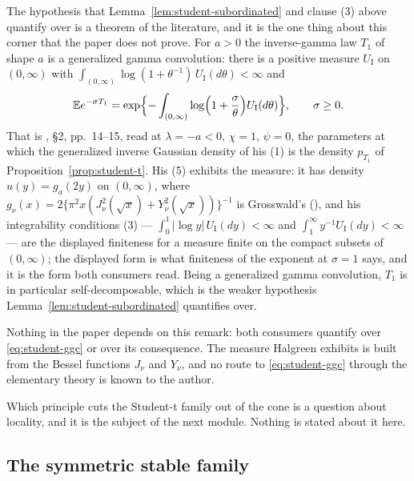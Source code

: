 \begin{remark}
\label{rem:student-ggc}
The hypothesis that Lemma~\ref{lem:student-subordinated} and clause (3) above quantify over is
a theorem of the literature, and it is the one thing about this corner that the paper does not
prove. For $a > 0$ the inverse-gamma law $T_1$ of shape $a$ is a generalized gamma convolution:
there is a positive measure $U_{\mathrm I}$ on $(0,\infty)$ with
$\int_{(0,\infty)}\log(1 + \theta^{-1})\,U_{\mathrm I}(d\theta) < \infty$ and
\begin{equation}\label{eq:student-ggc}
  \mathbb{E}e^{-\sigma T_1}
   = \exp\Bigl\{-\int_{(0,\infty)}\log\Bigl(1 + \frac{\sigma}{\theta}\Bigr)
       U_{\mathrm I}(d\theta)\Bigr\}, \qquad \sigma \ge 0 .
\end{equation}
That is , \S2, pp.~14--15, read at $\lambda = -a < 0$, $\chi = 1$,
$\psi = 0$, the parameters at which the generalized inverse Gaussian density of his (1) is the
density $p_{T_1}$ of Proposition~\ref{prop:student-t}. His (5) exhibits the measure: it has
density $u(y) = g_a(2y)$ on $(0,\infty)$, where
$g_\nu(x) = 2\{\pi^2x(J_\nu^2(\sqrt x) + Y_\nu^2(\sqrt x))\}^{-1}$ is Grosswald's
(), and his integrability conditions (3) ---
$\int_0^1|\log y|\,U_{\mathrm I}(dy) < \infty$ and $\int_1^\infty y^{-1}U_{\mathrm I}(dy) <
\infty$ --- are the displayed finiteness for a measure finite on the compact subsets of
$(0,\infty)$; the displayed form is what finiteness of the exponent at $\sigma = 1$ says, and it
is the form both consumers read. Being a generalized gamma convolution, $T_1$ is in particular
self-decomposable, which is the weaker hypothesis Lemma~\ref{lem:student-subordinated}
quantifies over.

Nothing in the paper depends on this remark: both consumers quantify over
\ref{eq:student-ggc} or over its consequence. The measure Halgreen exhibits is built from the
Bessel functions $J_\nu$ and $Y_\nu$, and no route to \ref{eq:student-ggc} through the
elementary theory is known to the author.
\end{remark}

Which principle cuts the Student-t family out of the cone is a question about locality, and it
is the subject of the next module. Nothing is stated about it here.

\subsection{The symmetric stable family}\label{sec:stable}

